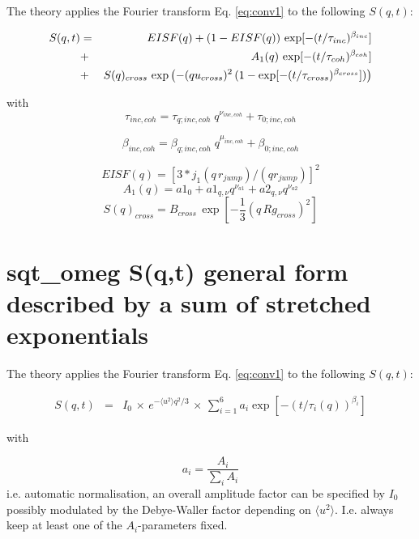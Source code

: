\documentclass[11pt,fleqn]{book} %
\newcommand{\desc}[1]{\hskip 0.5cm {\color{descgray} #1}}
\begin{document}
The theory applies the Fourier transform Eq. \ref{eq:conv1} to the following $S(q,t)$:

\begin{eqnarray}
S(q,t) &=& EISF(q)+(1-EISF(q)) \, \exp[-(t/\tau_{inc})^{\beta_{inc}}]  \cr
           &+&  A_1(q) \, \exp[-(t/\tau_{coh})^{\beta_{coh}}]       \cr
           &+&  S(q)_{cross} \, \exp \left (   -(q u_{cross})^2 \,(1-\exp[-(t/\tau_{cross})^{\beta_{cross}}]) \right )  
\end{eqnarray}

with
\begin{equation}
 \tau_{inc,coh}    = \tau_{q;inc,coh} \;  q^{\nu_{inc,coh}} + \tau_{0;inc,coh}
\end{equation}

\begin{equation}
 \beta_{inc,coh}    = \beta_{q;inc,coh} \;  q^{\mu_{inc,coh}} + \beta_{0;inc,coh}
\end{equation}

\begin{equation}   
      EISF(q)       = [ 3  * j_1(q \,r_{jump}) / (q  r_{jump}) ]^2
\end{equation}
\begin{equation}
      A_1(q)         = a1_0  +  a1_{q,\nu}  q^{\nu_{a1}} + a2_{q,\nu}  q^{\nu_{a2}}
\end{equation}
\begin{equation}
      S(q)_{cross}      = B_{cross} \, \exp[ -\frac{1}{3} (q \,Rg_{cross})^2]
\end{equation}



\chapter{sqt\_omeg \desc{S(q,t) general form described by a sum of stretched exponentials }}

The theory applies the Fourier transform Eq. \ref{eq:conv1} to the following $S(q,t)$:

\begin{eqnarray}
S(q,t) &=& I_0 \, \times \, e^{-\langle u^2 \rangle q^2/3} \, \times \, \sum_{i=1}^6{a_i \exp[-(t/\tau_i(q))^{\beta_i}]}
\end{eqnarray}

with

\begin{equation}
a_i = \frac{A_i}{ \sum_i {A_i}}
\end{equation}
i.e. automatic normalisation, an overall amplitude factor can be specified by ${I_0}$ possibly modulated
by the Debye-Waller factor depending on ${\langle u^2 \rangle}$.
I.e. always keep at least one of the ${A_i}$-parameters fixed.
\end{document}

